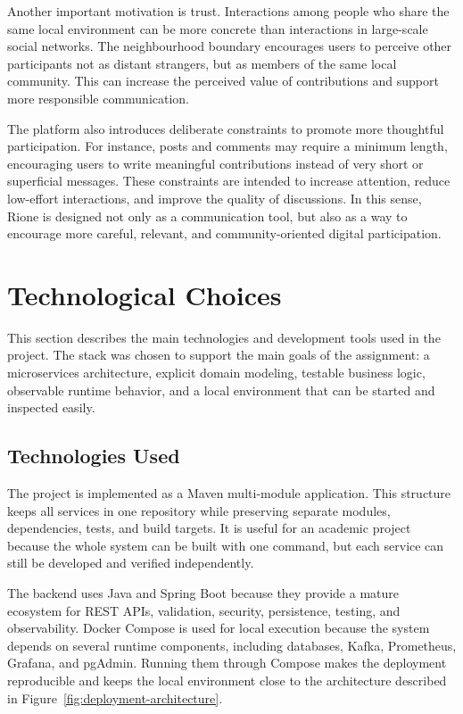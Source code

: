 \documentclass[12pt,a4paper]{article}
\begin{document}
Another important motivation is trust. Interactions among people who share the same local environment can be more concrete than interactions in large-scale social networks. The neighbourhood boundary encourages users to perceive other participants not as distant strangers, but as members of the same local community. This can increase the perceived value of contributions and support more responsible communication.

The platform also introduces deliberate constraints to promote more thoughtful participation. For instance, posts and comments may require a minimum length, encouraging users to write meaningful contributions instead of very short or superficial messages. These constraints are intended to increase attention, reduce low-effort interactions, and improve the quality of discussions. In this sense, Rione is designed not only as a communication tool, but also as a way to encourage more careful, relevant, and community-oriented digital participation.

\section{Technological Choices}

This section describes the main technologies and development tools used in the project. The stack was chosen to support the main goals of the assignment: a microservices architecture, explicit domain modeling, testable business logic, observable runtime behavior, and a local environment that can be started and inspected easily.

\subsection{Technologies Used}

The project is implemented as a Maven multi-module application. This structure keeps all services in one repository while preserving separate modules, dependencies, tests, and build targets. It is useful for an academic project because the whole system can be built with one command, but each service can still be developed and verified independently.

The backend uses Java and Spring Boot because they provide a mature ecosystem for REST APIs, validation, security, persistence, testing, and observability. Docker Compose is used for local execution because the system depends on several runtime components, including databases, Kafka, Prometheus, Grafana, and pgAdmin. Running them through Compose makes the deployment reproducible and keeps the local environment close to the architecture described in Figure~\ref{fig:deployment-architecture}.
\end{document}
